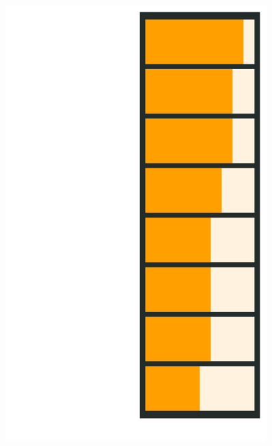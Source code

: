\documentclass[11pt, a4paper]{article}
\begin{document}
\begin{figure}[H]
\begin{minipage}[t]{0.3\textwidth}
\begin{center}
\includegraphics[width=0.9\textwidth]{./figures/skill_figure.png}
\end{center}


\end{minipage} 

\end{figure}
\end{document}
